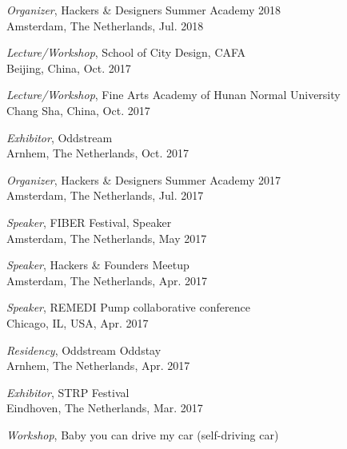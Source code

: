 \begin{itemize}[leftmargin=0.15in, label={}]
{{        {\emph{Organizer}, Hackers \& Designers Summer Academy 2018} \\
        {Amsterdam, The Netherlands, Jul. 2018} \\
    }}
    \small{\item{
        {\emph{Lecture/Workshop}, School of City Design, CAFA} \\
        {Beijing, China, Oct. 2017} \\
    }}
    \small{\item{
        {\emph{Lecture/Workshop}, Fine Arts Academy of Hunan Normal University} \\
        {Chang Sha, China, Oct. 2017} \\
    }}
    \small{\item{
        {\emph{Exhibitor}, Oddstream} \\
        {Arnhem, The Netherlands, Oct. 2017} \\
    }}
    \small{\item{
        {\emph{Organizer}, Hackers \& Designers Summer Academy 2017} \\
        {Amsterdam, The Netherlands, Jul. 2017} \\
    }}
    \small{\item{
        {\emph{Speaker}, FIBER Festival, Speaker} \\
        {Amsterdam, The Netherlands, May 2017} \\
    }}
    \small{\item{
        {\emph{Speaker}, Hackers \& Founders Meetup} \\
        {Amsterdam, The Netherlands, Apr. 2017} \\
    }}
    \small{\item{
        {\emph{Speaker}, REMEDI Pump collaborative conference} \\
        {Chicago, IL, USA, Apr. 2017} \\
    }}
    \small{\item{
        {\emph{Residency}, Oddstream Oddstay} \\
        {Arnhem, The Netherlands, Apr. 2017} \\
    }}
    \small{\item{
        {\emph{Exhibitor}, STRP Festival} \\
        {Eindhoven, The Netherlands, Mar. 2017} \\
    }}
    \small{\item{
        {\emph{Workshop}, Baby you can drive my car (self-driving car)} \\
}}
\end{itemize}
